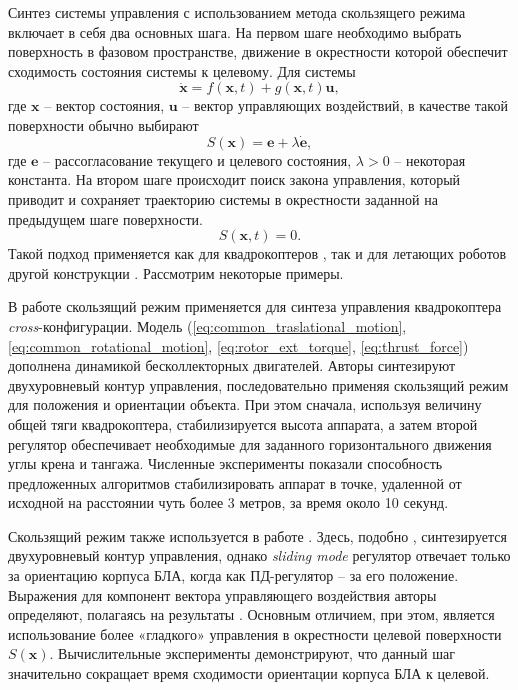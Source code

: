 Синтез системы управления с использованием метода скользящего режима включает в себя два основных шага. На первом шаге необходимо выбрать поверхность в фазовом пространстве, движение в окрестности которой обеспечит сходимость состояния системы к целевому. Для системы
\begin{equation} \label{eq:slide_mode_system}
\dot{\bm x} = f(\bm x, t) + g( \bm x, t) \bm u,
\end{equation}
где $\bm x$ -- вектор состояния, $\bm u$ -- вектор управляющих воздействий, в качестве такой поверхности обычно выбирают \cite{Samir01}
\begin{equation} \label{eq:slide_mode_S}
S(\bm x) = \bm e + \lambda \dot{\bm e},
\end{equation}
где $\bm e$ -- рассогласование текущего и целевого состояния, $\lambda > 0$ -- некоторая константа. На втором шаге происходит поиск закона управления, который приводит и сохраняет траекторию системы в окрестности заданной на предыдущем шаге поверхности.
\begin{equation} \label{eq:slide_mode_on_S}
S(\bm x,t) = 0.
\end{equation}
Такой подход применяется как для квадрокоптеров \cite{Stevanovic01, Lebedev01, Xu01}, так и для летающих роботов другой конструкции \cite{Yih01, Zhu01}. Рассмотрим некоторые примеры.

В работе \cite{Samir01} скользящий режим применяется для синтеза управления квадрокоптера \textit{cross}-конфигурации.
Модель (\ref{eq:common_traslational_motion}, \ref{eq:common_rotational_motion}, \ref{eq:rotor_ext_torque}, \ref{eq:thrust_force}) дополнена динамикой бесколлекторных двигателей.
Авторы синтезируют двухуровневый контур управления, последовательно применяя скользящий режим для положения и ориентации объекта. При этом сначала, используя величину общей тяги квадрокоптера, стабилизируется высота аппарата, а затем второй регулятор обеспечивает необходимые для заданного горизонтального движения углы крена и тангажа. Численные эксперименты показали способность предложенных алгоритмов стабилизировать аппарат в точке, удаленной от исходной на расстоянии чуть более 3 метров, за время около 10 секунд.

Скользящий режим также используется в работе \cite{Runcharoon01}. Здесь, подобно \cite{Samir01}, синтезируется двухуровневый контур управления, однако \textit{sliding mode} регулятор отвечает только за ориентацию корпуса БЛА, когда как ПД-регулятор -- за его положение. Выражения для компонент вектора управляющего воздействия авторы определяют, полагаясь на результаты \cite{Slotine01}. Основным отличием, при этом, является использование более «гладкого» управления в окрестности целевой поверхности $S(\bm x)$. Вычислительные эксперименты демонстрируют, что данный шаг значительно сокращает время сходимости  ориентации корпуса БЛА к целевой. 

